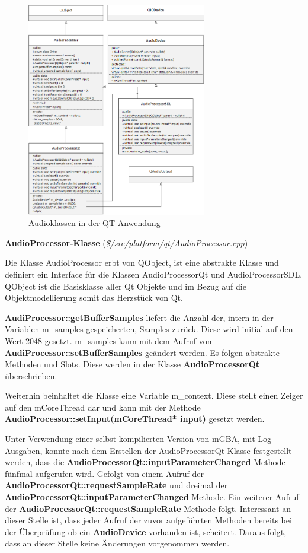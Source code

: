 \documentclass[11pt,a4paper]{scrartcl}
\newcommand{\paratitlecode}[2] {
    \vspace{5mm}
    \large \textbf{#1} \normalsize(\textit{\${#2}})
    \vspace{2mm}\newline
}
\begin{document}
\begin{figure}[h!]
    \centering
    \includegraphics[width=0.7\textwidth]{QT_Klassendiagramm}
    \caption{Audioklassen in der QT-Anwendung}
    \label{fig:qtclassdiagramm}
\end{figure}

\newpage

\paratitlecode{AudioProcessor-Klasse}{/src/platform/qt/AudioProcessor.cpp}
Die Klasse AudioProcessor erbt von QObject, ist eine abstrakte Klasse und definiert ein Interface f\"ur die Klassen AudioProcessorQt und AudioProcessorSDL. QObject ist die Basisklasse aller Qt Objekte und im Bezug auf
die Objektmodellierung somit das Herzst\"uck von Qt. 

\textbf{AudiProcessor::getBufferSamples} liefert die Anzahl der, intern in der Variablen m\_samples gespeicherten, Samples zur\"uck. Diese wird initial auf den Wert 2048 gesetzt. m\_samples kann mit dem Aufruf von \textbf{AudiProcessor::setBufferSamples} ge\"andert werden. Es folgen abstrakte Methoden und Slots. Diese werden in der Klasse \textbf{AudioProcessorQt} \"uberschrieben.

Weiterhin beinhaltet die Klasse eine Variable m\_context. Diese stellt einen Zeiger auf den mCoreThread dar und kann mit der Methode \textbf{AudioProcessor::setInput(mCoreThread* input)} gesetzt werden. 

Unter Verwendung einer selbst kompilierten Version von mGBA, mit Log-Ausgaben, konnte nach dem Erstellen der AudioProcessorQt-Klasse festgestellt werden, dass 
die \textbf{AudioProcessorQt::inputParameterChanged} Methode f\"unfmal aufgerufen wird. Gefolgt von einem Aufruf der \textbf{AudioProcessorQt::requestSampleRate} und dreimal der \textbf{AudioProcessorQt::inputParameterChanged} Methode. Ein weiterer Aufruf der \textbf{AudioProcessorQt::requestSampleRate} Methode folgt. Interessant an dieser Stelle ist, dass jeder Aufruf der zuvor aufgef\"uhrten Methoden bereits bei der \"Uberpr\"ufung ob ein \textbf{AudioDevice} vorhanden ist, scheitert. 
Daraus folgt, dass an dieser Stelle keine \"Anderungen vorgenommen werden. %
\end{document}
